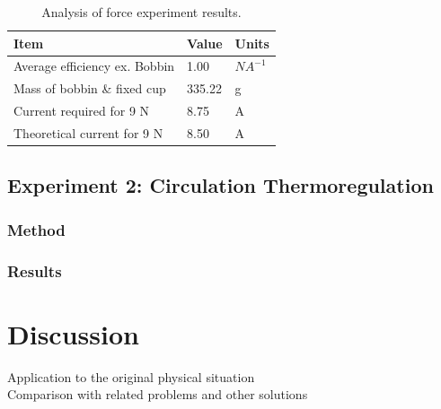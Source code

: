 \documentclass[a4paper,12pt]{article}
\begin{document}
\begin{table}[h!] 
	\centering
	\caption{Analysis of force experiment results.}
	\label{tb:fullresults3}
	\begin{tabular}{ lll }
		Item & Value & Units \\
		\hline\hline
		Average efficiency ex. Bobbin & 1.00 & $NA^{-1}$ \\
		\hline
		Mass of bobbin \& fixed cup & 335.22 & g \\
		\hline
		Current required for 9 N & 8.75 & A \\
		\hline
		Theoretical current for 9 N & 8.50 & A \\
		\hline 
	\end{tabular}
\end{table}

\subsection{Experiment 2: Circulation Thermoregulation}

\subsubsection{Method}

\subsubsection{Results}

\newpage

\section{Discussion}

Application to the original physical situation\\ 

Comparison with related problems and other solutions\\
\end{document}
